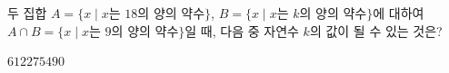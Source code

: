 두 집합 $A=\{x \mid x$는 $18$의 양의 약수$\}$, $B=\{x \mid x$는 $k$의 양의 약수$\}$에 대하여 $A\cap B=\{x \mid x$는 $9$의 양의 약수$\}$일 때, 다음 중 자연수 $k$의 값이 될 수 있는 것은?
\begin{choices32}{$6$}{$12$}{$27$}{$54$}{$90$}\end{choices32}
